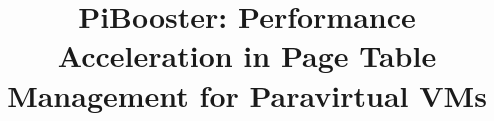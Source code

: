 \documentclass[10pt,preprint]{sigplanconf}
\begin{document}
\newcommand{\name}{PiBooster\xspace}
\newcommand{\cache}{PiBooster cache\xspace}
\newcommand{\module}{PiBooster module\xspace}
\newcommand{\prename}{Pre-PiBooster\xspace}
\newcommand{\dynname}{Dyn-PiBooster\xspace}
\newcommand{\eat}[1]{}  %
\newcommand{\authcomment}[3]{\textcolor{#3}{#1 says: #2}}\newcommand{\yueqiang}[1]{\authcomment{Yueqiang}{#1}{red}}
\newcommand{\zhi}[1]{\authcomment{Zhi}{#1}{blue}}
\newcommand{\mypara}[1]{\vspace{2pt}\noindent\textbf{{#1. }}}


\date{}

\title{\Large \bf PiBooster: Performance Acceleration in Page Table Management for Paravirtual VMs}


\maketitle
\end{document}
